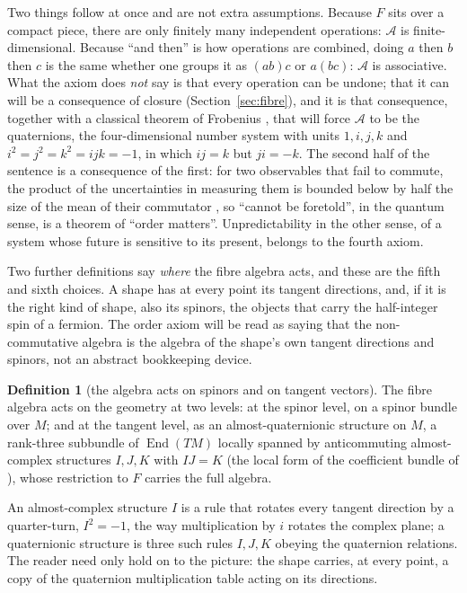 \documentclass[11pt,a4paper]{article}
\theoremstyle{plain}
\theoremstyle{definition}
\newtheorem{definition}[theorem]{Definition}
\theoremstyle{remark}
\begin{document}
Two things follow at once and are not extra assumptions. Because $F$ sits over a compact piece, there are only finitely many independent operations: $\mathcal{A}$ is finite-dimensional. Because ``and then'' is how operations are combined, doing $a$ then $b$ then $c$ is the same whether one groups it as $(ab)c$ or $a(bc)$: $\mathcal{A}$ is associative. What the axiom does \emph{not} say is that every operation can be undone; that it can will be a consequence of closure (Section~\ref{sec:fibre}), and it is that consequence, together with a classical theorem of Frobenius \cite{Frobenius1878}, that will force $\mathcal{A}$ to be the quaternions, the four-dimensional number system with units $1,i,j,k$ and $i^{2}=j^{2}=k^{2}=ijk=-1$, in which $ij=k$ but $ji=-k$. The second half of the sentence is a consequence of the first: for two observables that fail to commute, the product of the uncertainties in measuring them is bounded below by half the size of the mean of their commutator \cite{Robertson1929}, so ``cannot be foretold'', in the quantum sense, is a theorem of ``order matters''. Unpredictability in the other sense, of a system whose future is sensitive to its present, belongs to the fourth axiom.

Two further definitions say \emph{where} the fibre algebra acts, and these are the fifth and sixth choices. A shape has at every point its tangent directions, and, if it is the right kind of shape, also its spinors, the objects that carry the half-integer spin of a fermion. The order axiom will be read as saying that the non-commutative algebra is the algebra of the shape's own tangent directions and spinors, not an abstract bookkeeping device.

\begin{definition}[the algebra acts on spinors and on tangent vectors]\label{def:levels}
The fibre algebra acts on the geometry at two levels: at the spinor level, on a spinor bundle over $M$; and at the tangent level, as an almost-quaternionic structure on $M$, a rank-three subbundle of $\operatorname{End}(TM)$ locally spanned by anticommuting almost-complex structures $I,J,K$ with $IJ=K$ (the local form of the coefficient bundle of \cite{Salamon1982}), whose restriction to $F$ carries the full algebra.
\end{definition}

An almost-complex structure $I$ is a rule that rotates every tangent direction by a quarter-turn, $I^{2}=-1$, the way multiplication by $i$ rotates the complex plane; a quaternionic structure is three such rules $I,J,K$ obeying the quaternion relations. The reader need only hold on to the picture: the shape carries, at every point, a copy of the quaternion multiplication table acting on its directions.
\end{document}
